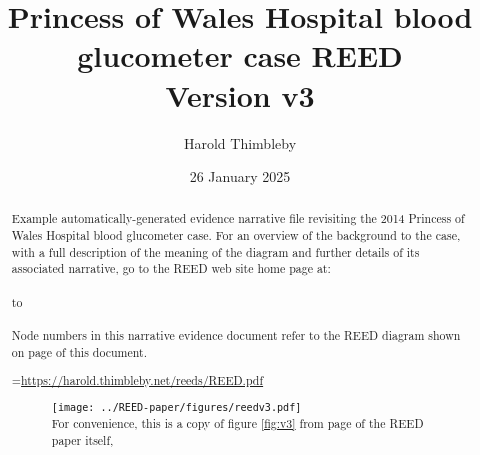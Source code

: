 \title{Princess of Wales Hospital blood glucometer case REED\\Version v3}\author{Harold Thimbleby}
\date{26 January 2025}
 \maketitle
\def\colorflag#1{\fboxrule=0.3pt
\fboxsep=0pt
\hbox{\vrule height 2.2ex width 1pt
\raise 1ex\hbox{\fbox{\color{#1}\hbox{\vrule width .5ex height 1ex depth 0ex}}}%
\hskip -.6pt\raise .9ex\hbox{\fbox{\color{#1}\hbox{\vrule width .5ex height 1ex depth 0ex}}}%
\hskip -.6pt\raise 1ex\hbox{\fbox{\color{#1}\hbox{\vrule width .7ex height 1ex depth 0ex}}}}%
}
\begin{abstract}
\noindent
Example automatically-generated evidence narrative file revisiting the 2014 Princess of Wales Hospital blood glucometer case. For an overview of the background to the case, with a full description of the meaning of the diagram and further details of its associated narrative, go to  
the REED web site home page at: \\ \\ \hbox to  \\ \\
Node numbers in this narrative evidence document refer to the REED diagram shown on page \pageref{thefigure} of this document.

=\hbox{\textcolor{blue}{\url{https://harold.thimbleby.net/reeds/REED.pdf}}}

\begin{figure}\texttt{[image: ../REED-paper/figures/reedv3.pdf]}\\
\sf For convenience, this is a copy of figure \ref{fig:v3} from page \pageref{fig:v3} of the REED paper itself,\\ 
\label{thefigure}
\end{figure}\newpage

\end{abstract}
